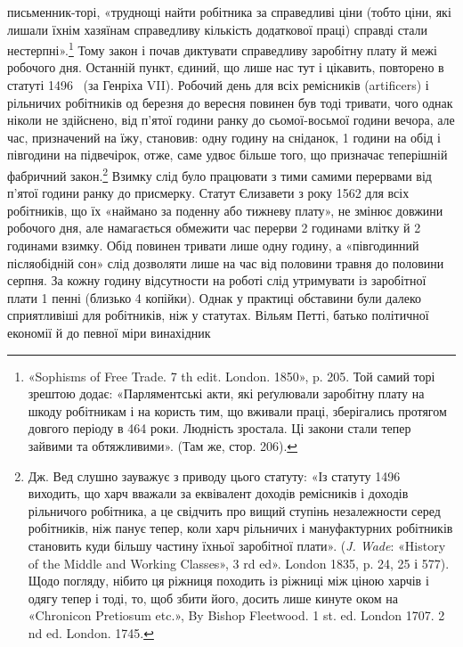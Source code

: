 \parcont{}  %
письменник-торі, «труднощі найти робітника за справедливі
ціни (тобто ціни, які лишали їхнім хазяїнам справедливу кількість
додаткової праці) справді стали нестерпні».\footnote{
«Sophisms of Free Trade. 7 th edit. London. 1850», p. 205. Той
самий торі зрештою додає: «Парляментські акти, які реґулювали заробітну
плату на шкоду робітникам і на користь тим, що вживали праці,
зберігались протягом довгого періоду в 464 роки. Людність зростала.
Ці закони стали тепер зайвими та обтяжливими». (Там же, стор. 206).
} Тому закон і
почав диктувати справедливу заробітну плату й межі робочого
дня. Останній пункт, єдиний, що лише нас тут і цікавить, повторено
в статуті 1496~ (за Генріха VII). Робочий день для всіх
ремісників (artificers) і рільничих робітників од березня до вересня
повинен був тоді тривати, чого однак ніколи не здійснено,
від п’ятої години ранку до сьомої-восьмої години вечора,
але час, призначений на їжу, становив: одну годину на сніданок,
1 години на обід і півгодини на підвечірок, отже, саме
удвоє більше того, що призначає теперішній фабричний закон.\footnote{
Дж. Вед слушно зауважує з приводу цього статуту: «Із статуту
1496~ виходить, що харч вважали за еквівалент  доходів ремісників
і  доходів рільничого робітника, а це свідчить про вищий ступінь незалежности
серед робітників, ніж панує тепер, коли харч рільничих і мануфактурних
робітників становить куди більшу частину їхньої заробітної
плати». (\emph{J. Wade}: «History of the Middle and Working Classes», 3 rd
ed». London 1835, p. 24, 25 і 577). Щодо погляду, нібито ця ріжниця
походить із ріжниці між ціною харчів і одягу тепер і тоді, то, щоб збити
його, досить лише кинуте оком на «Chronicon Pretiosum etc.», By Bishop
Fleetwood. 1 st. ed. London 1707. 2 nd ed. London. 1745.
} Взимку слід було працювати з тими самими перервами від п’ятої
години ранку до присмерку. Статут Єлизавети з року 1562 для
всіх робітників, що їх «наймано за поденну або тижневу плату»,
не змінює довжини робочого дня, але намагається обмежити час
перерви 2 годинами влітку й 2 годинами взимку. Обід повинен
тривати лише одну годину, а «півгодинний післяобідній сон» слід
дозволяти лише на час від половини травня до половини серпня.
За кожну годину відсутности на роботі слід утримувати із заробітної
плати 1 пенні (близько 4 копійки). Однак у практиці обставини
були далеко сприятливіші для робітників, ніж у статутах.
Вільям Петті, батько політичної економії й до певної міри винахідник
